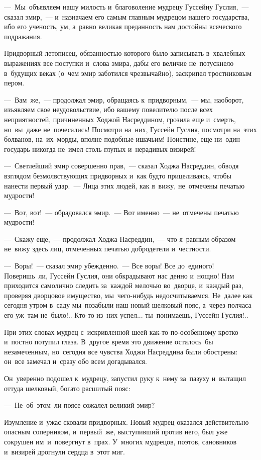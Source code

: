 \documentclass[12pt,a4paper]{book}
\begin{document}
—~Мы~объявляем нашу милость и~благоволение мудрецу Гуссейну Гуслия,~— сказал эмир,~— и~назначаем его самым главным мудрецом нашего государства, ибо его ученость, ум, а~равно великая преданность нам достойны всяческого подражания.

Придворный летописец, обязанностью которого было записывать в~хвалебных выражениях все поступки и~слова эмира, дабы его величие не~потускнело в~будущих веках (о~чем эмир заботился чрезвычайно), заскрипел тростниковым пером.

—~Вам~же,~— продолжал эмир, обращаясь к~придворным,~— мы, наоборот, изъявляем свое неудовольствие, ибо вашему повелителю после всех неприятностей, причиненных Ходжой Насреддином, грозила еще и~смерть, но~вы~даже не~почесались! Посмотри на~них, Гуссейн Гуслия, посмотри на~этих болванов, на~их~морды, вполне подобные ишачьим! Поистине, еще ни~один государь никогда не~имел столь глупых и~нерадивых визирей!

—~Светлейший эмир совершенно прав,~— сказал Ходжа Насреддин, обводя взглядом безмолвствующих придворных и~как будто прицеливаясь, чтобы нанести первый удар.~— Лица этих людей, как я~вижу, не~отмечены печатью мудрости!

—~Вот, вот!~— обрадовался эмир.~— Вот именно~— не~отмечены печатью мудрости!

—~Скажу еще,~— продолжал Ходжа Насреддин,~— что я~равным образом не~вижу здесь лиц, отмеченных печатью добродетели и~честности.

—~Воры!~— сказал эмир убежденно.~— Все воры! Все до~единого! Поверишь~ли, Гуссейн Гуслия, они обкрадывают нас денно и~нощно! Нам приходится самолично следить за~каждой мелочью во~дворце, и~каждый раз, проверяя дворцовое имущество, мы~чего-нибудь недосчитываемся. Не~далее как сегодня утром в~саду мы~позабыли наш новый шелковый пояс, а~через полчаса его уж~там не~было!.. Кто-то из~них успел... ты~понимаешь, Гуссейн Гуслия!..

При этих словах мудрец с~искривленной шеей как-то по-особенному кротко и~постно потупил глаза. В~другое время это движение осталось~бы незамеченным, но~сегодня все чувства Ходжи Насреддина были обострены: он~все замечал и~сразу обо всем догадывался.

Он~уверенно подошел к~мудрецу, запустил руку к~нему за~пазуху и~вытащил оттуда шелковый, богато расшитый пояс:

—~Не~об~этом~ли поясе сожалел великий эмир?

Изумление и~ужас сковали придворных. Новый мудрец оказался действительно опасным соперником, и~первый~же, выступивший против него, был уже сокрушен им~и~повергнут в~прах. У~многих мудрецов, поэтов, сановников и~визирей дрогнули сердца в~этот миг.
\end{document}
